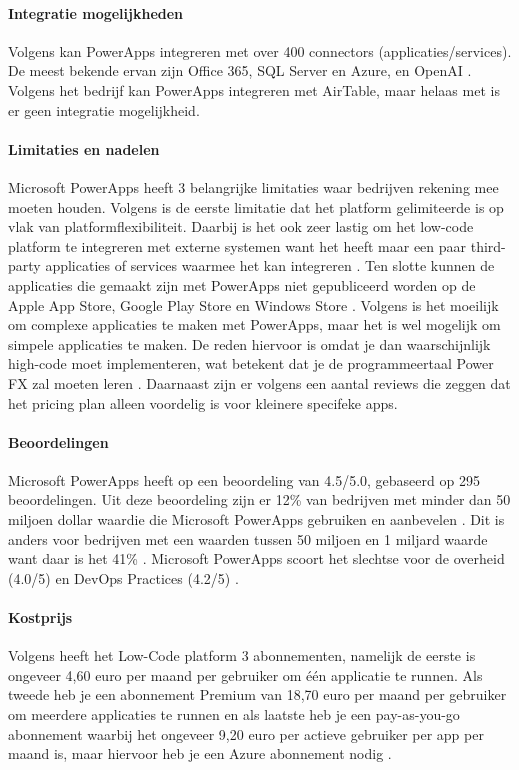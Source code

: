\paragraph{Integratie mogelijkheden}
Volgens \textcite{Nguyen} kan PowerApps integreren met over 400 connectors (applicaties/services). De meest bekende
ervan zijn Office 365, SQL Server en Azure,  en OpenAI \autocite{Nguyen}. Volgens het bedrijf \textcite{Microsoft2024} kan PowerApps integreren met 
AirTable, maar helaas met \textcite{MAKE.com2024a} is er geen integratie mogelijkheid.
\paragraph*{Limitaties en nadelen}
Microsoft PowerApps heeft 3 belangrijke limitaties waar bedrijven rekening mee moeten houden. 
Volgens \textcite{Gupta2023} is de eerste limitatie dat het platform gelimiteerde is op vlak van platformflexibiliteit.
Daarbij is het ook zeer lastig om het low-code platform te integreren met externe systemen want het heeft maar een paar 
third-party applicaties of services waarmee het kan integreren \autocite{Gupta2023}. Ten slotte kunnen de applicaties die gemaakt zijn met
PowerApps niet gepubliceerd worden op de Apple App Store, Google Play Store en Windows Store \autocite{Gupta2023}.
Volgens \textcite{Nguyen} is het moeilijk om complexe applicaties te maken met PowerApps, maar het is wel mogelijk om simpele applicaties te maken.
De reden hiervoor is omdat je dan waarschijnlijk high-code moet implementeren, wat betekent dat je de programmeertaal Power FX zal moeten leren \autocite{Nguyen}.
Daarnaast zijn er volgens \textcite{Nguyen} een aantal reviews die zeggen dat het pricing plan alleen voordelig is voor kleinere specifeke apps.
\paragraph{Beoordelingen}
Microsoft PowerApps heeft op \textcite{Gartner2024} een beoordeling van 4.5/5.0, gebaseerd op 295 beoordelingen.
Uit deze beoordeling zijn er 12\% van bedrijven met minder dan 50 miljoen dollar waardie die Microsoft PowerApps gebruiken en aanbevelen \autocite{Gartner2024}.
Dit is anders voor bedrijven met een waarden tussen 50 miljoen en 1 miljard waarde want daar is het 41\% \autocite{Gartner2024}.
Microsoft PowerApps scoort het slechtse voor de overheid (4.0/5) en DevOps Practices (4.2/5) \autocite{Gartner2024}.

\paragraph{Kostprijs}
Volgens \textcite{Gupta2023} heeft het Low-Code platform 3 abonnementen, namelijk de eerste is ongeveer 4,60 euro per maand per gebruiker om één applicatie te runnen.
Als tweede heb je een abonnement Premium van 18,70 euro per maand per gebruiker om meerdere applicaties te runnen en als laatste heb je een pay-as-you-go abonnement
waarbij het ongeveer 9,20 euro per actieve gebruiker per app per maand is, maar hiervoor heb je een Azure abonnement nodig \autocite{Gupta2023}.
